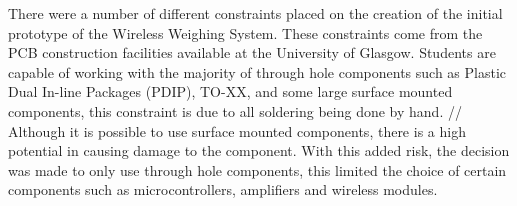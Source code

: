 There were a number of different constraints placed on the creation of the initial prototype of the Wireless Weighing System. These constraints come from the PCB construction
 facilities available at the University of Glasgow. Students are capable of working with the majority of through hole components such as Plastic Dual In-line Packages (PDIP),
TO-XX, and some large surface mounted components, this constraint is due to all soldering being done by hand. //
Although it is possible to use surface mounted components, there is a high potential in causing damage to the component. With this added risk, the decision was made to only 
use through hole components, this limited the choice of certain components such as microcontrollers, amplifiers and wireless modules.
